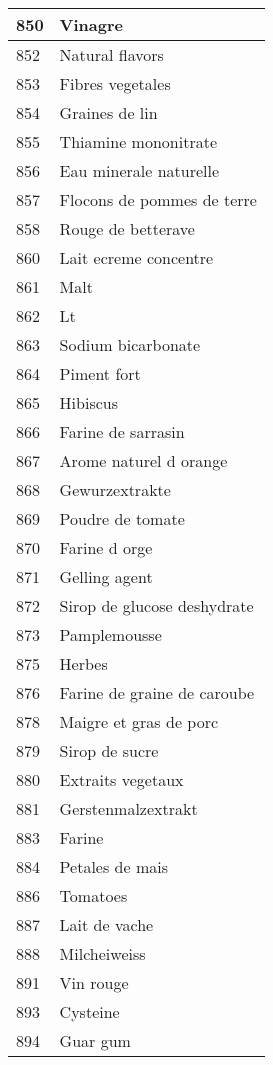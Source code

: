 \begin{longtable}{|l|l|}
850 & Vinagre \\ \hline 
852 & Natural flavors \\ \hline 
853 & Fibres vegetales \\ \hline 
854 & Graines de lin \\ \hline 
855 & Thiamine mononitrate \\ \hline 
856 & Eau minerale naturelle \\ \hline 
857 & Flocons de pommes de terre \\ \hline 
858 & Rouge de betterave \\ \hline 
860 & Lait ecreme concentre \\ \hline 
861 & Malt \\ \hline 
862 & Lt \\ \hline 
863 & Sodium bicarbonate \\ \hline 
864 & Piment fort \\ \hline 
865 & Hibiscus \\ \hline 
866 & Farine de sarrasin \\ \hline 
867 & Arome naturel d orange \\ \hline 
868 & Gewurzextrakte \\ \hline 
869 & Poudre de tomate \\ \hline 
870 & Farine d orge \\ \hline 
871 & Gelling agent \\ \hline 
872 & Sirop de glucose deshydrate \\ \hline 
873 & Pamplemousse \\ \hline 
875 & Herbes \\ \hline 
876 & Farine de graine de caroube \\ \hline 
878 & Maigre et gras de porc \\ \hline 
879 & Sirop de sucre \\ \hline 
880 & Extraits vegetaux \\ \hline 
881 & Gerstenmalzextrakt \\ \hline 
883 & Farine \\ \hline 
884 & Petales de mais \\ \hline 
886 & Tomatoes \\ \hline 
887 & Lait de vache \\ \hline 
888 & Milcheiweiss \\ \hline 
891 & Vin rouge \\ \hline 
893 & Cysteine \\ \hline 
894 & Guar gum \\ \hline 

\end{longtable}
